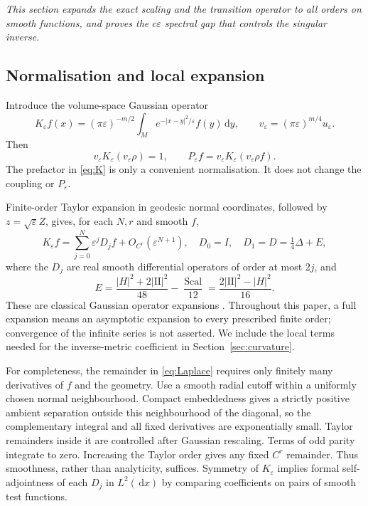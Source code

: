 \documentclass[11pt,a4paper]{article}
\theoremstyle{definition}\newtheorem{definition}[theorem]{Definition}
\theoremstyle{remark}\newtheorem{remark}[theorem]{Remark}
\newcommand{\eps}{\varepsilon}
\newcommand{\dd}{\,\mathrm d}
\newcommand{\II}{\mathrm{II}}
\newcommand{\Scal}{\operatorname{Scal}}
\begin{document}
\noindent\emph{This section expands the exact scaling and the transition operator to all orders on smooth functions, and proves the $c\eps$ spectral gap that controls the singular inverse.}

\subsection{Normalisation and local expansion}
Introduce the volume-space Gaussian operator
\begin{equation}\label{eq:K}
K_\eps f(x)=(\pi\eps)^{-m/2}\int_Me^{-|x-y|^2/\eps}f(y)\dd y,
\qquad v_\eps=(\pi\eps)^{m/4}u_\eps.
\end{equation}
Then
\begin{equation}\label{eq:vscale}
v_\eps K_\eps(v_\eps\rho)=1,
\qquad P_\eps f=v_\eps K_\eps(v_\eps\rho f).
\end{equation}
The prefactor in \eqref{eq:K} is only a convenient normalisation. It does not change the coupling or $P_\eps$.

Finite-order Taylor expansion in geodesic normal coordinates, followed by $z=\sqrt\eps Z$, gives, for each $N,r$ and smooth $f$,
\begin{equation}\label{eq:Laplace}
K_\eps f=\sum_{j=0}^{N}\eps^jD_jf+O_{C^r}(\eps^{N+1}),
\quad D_0=I,\quad D_1=D=\tfrac14\Delta+E,
\end{equation}
where the $D_j$ are real smooth differential operators of order at most $2j$, and
\begin{equation}\label{eq:E}
E=\frac{|H|^2+2|\II|^2}{48}-\frac{\Scal}{12}
=\frac{2|\II|^2-|H|^2}{16}.
\end{equation}
These are classical Gaussian operator expansions \cite{LiouLu,CL}. Throughout this paper, a full expansion means an asymptotic expansion to every prescribed finite order; convergence of the infinite series is not asserted. We include the local terms needed for the inverse-metric coefficient in Section~\ref{sec:curvature}.

For completeness, the remainder in \eqref{eq:Laplace} requires only finitely many derivatives of $f$ and the geometry. Use a smooth radial cutoff within a uniformly chosen normal neighbourhood. Compact embeddedness gives a strictly positive ambient separation outside this neighbourhood of the diagonal, so the complementary integral and all fixed derivatives are exponentially small. Taylor remainders inside it are controlled after Gaussian rescaling. Terms of odd parity integrate to zero. Increasing the Taylor order gives any fixed $C^r$ remainder. Thus smoothness, rather than analyticity, suffices. Symmetry of $K_\eps$ implies formal self-adjointness of each $D_j$ in $L^2(\dd x)$ by comparing coefficients on pairs of smooth test functions.
\end{document}
